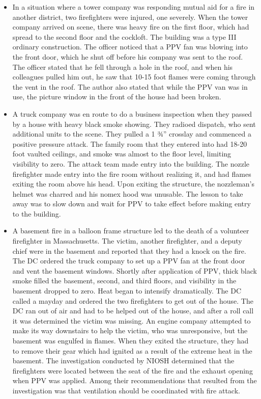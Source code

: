 \documentclass{article}
\begin{document}
\begin{itemize}
\item{In a situation where a tower company was responding mutual aid for a fire in another district, two firefighters were injured, one severely. When the tower company arrived on scene, there was heavy fire on the first floor, which had spread to the second floor and the cockloft. The building was a type III ordinary construction. The officer noticed that a PPV fan was blowing into the front door, which he shut off before his company was sent to the roof. The officer stated that he fell through a hole in the roof, and when his colleagues pulled him out, he saw that 10-15 foot flames were coming through the vent in the roof. The author also stated that while the PPV van was in use, the picture window in the front of the house had been broken.\cite{GoldfelderCritCoord}\\}
	
\item{A truck company was en route to do a business inspection when they passed by a house with heavy black smoke showing. They radioed dispatch, who sent additional units to the scene. They pulled a 1 ¾” crosslay and commenced a positive pressure attack. The family room that they entered into had 18-20 foot vaulted ceilings, and smoke was almost to the floor level, limiting visibility to zero. The attack team made entry into the building. The nozzle firefighter made entry into the fire room without realizing it, and had flames exiting the room above his head. Upon exiting the structure, the nozzleman’s helmet was charred and his nomex hood was unusable. The lesson to take away was to slow down and wait for PPV to take effect before making entry to the building.\cite{VaultedCeilingsFFCC}\\}
	
\item{A basement fire in a balloon frame structure led to the death of a volunteer firefighter in Massachusetts. The victim, another firefighter, and a deputy chief were in the basement and reported that they had a knock on the fire. The DC ordered the truck company to set up a PPV fan at the front door and vent the basement windows. Shortly after application of PPV, thick black smoke filled the basement, second, and third floors, and visibility in the basement dropped to zero.  Heat began to intensify dramatically. The DC called a mayday and ordered the two firefighters to get out of the house. The DC ran out of air and had to be helped out of the house, and after a roll call it was determined the victim was missing. An engine company attempted to make its way downstairs to help the victim, who was unresponsive, but the basement was engulfed in flames. When they exited the structure, they had to remove their gear which had ignited as a result of the extreme heat in the basement. The investigation conducted by NIOSH determined that the firefighters were located between the seat of the fire and the exhaust opening when PPV was applied. Among their recommendations that resulted from the investigation was that ventilation should be coordinated with fire attack.\cite{NIOSHF2004-02}\\}

\end{itemize}
\end{document}
